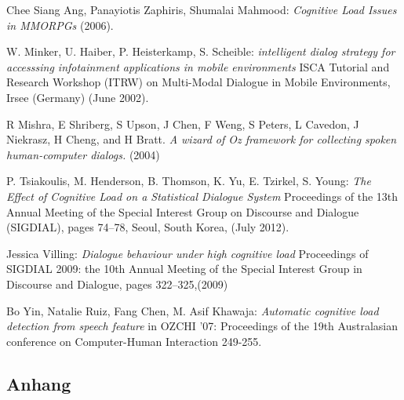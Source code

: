 \documentclass[12pt,a4paper]{scrartcl}
\begin{document}
\begin{thebibliography}{Maron \& Ames, 1982}

	 Chee Siang Ang, Panayiotis Zaphiris, Shumalai Mahmood: \textit{Cognitive Load Issues in MMORPGs} 
(2006).

	 W. Minker, U. Haiber, P. Heisterkamp, S. 
Scheible: \textit{intelligent dialog strategy for accesssing infotainment applications in mobile 
environments} ISCA Tutorial and Research Workshop (ITRW) on Multi-Modal Dialogue in Mobile 
Environments, Irsee (Germany) (June 2002).

 R Mishra, E Shriberg, S Upson, J Chen, F Weng, S Peters,
L Cavedon, J Niekrasz, H Cheng, and H Bratt. \textit{A wizard of Oz framework for collecting spoken human-computer dialogs.} (2004)

	 P. Tsiakoulis, M. Henderson, B. Thomson, K. Yu, E. Tzirkel, S. Young: \textit{The Effect of Cognitive Load on a Statistical Dialogue System} Proceedings of the 13th Annual Meeting of the Special Interest Group on Discourse and Dialogue (SIGDIAL), pages 74–78,
Seoul, South Korea, (July 2012).

 Jessica Villing: \textit{Dialogue behaviour under high cognitive load} Proceedings of SIGDIAL 2009: the 10th Annual Meeting of the Special Interest Group in Discourse and Dialogue, pages 322–325,(2009)



 Bo Yin, Natalie Ruiz, Fang Chen, M. Asif Khawaja: \textit{Automatic cognitive load detection from speech feature} in OZCHI ’07: Proceedings of the 19th Australasian conference on Computer-Human Interaction 249-255. 



\end{thebibliography}


\begin{appendix}

\section{Anhang}

\listoffigures
\cleardoublepage

\listoftables
\cleardoublepage

\end{appendix}
\cleardoublepage
\end{document}
